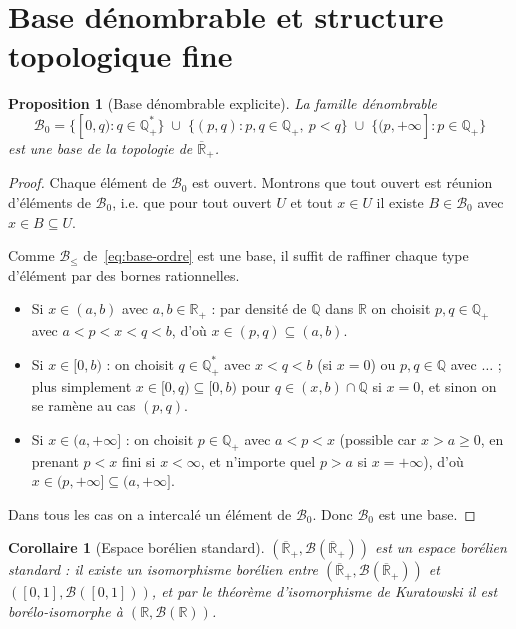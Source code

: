 \documentclass[11pt,a4paper]{article}
\theoremstyle{plain}
\newtheorem{proposition}[theorem]{Proposition}
\newtheorem{corollary}[theorem]{Corollaire}
\theoremstyle{definition}
\newcommand{\R}{\mathbb{R}}
\newcommand{\Q}{\mathbb{Q}}
\newcommand{\Rp}{\mathbb{R}_+}
\newcommand{\Rpb}{\overline{\mathbb{R}}_+}
\newcommand{\B}{\mathcal{B}}
\begin{document}
\section{Base dénombrable et structure topologique fine}

\begin{proposition}[Base dénombrable explicite]\label{prop:base-denombrable}
La famille dénombrable
\[
\mathcal{B}_0=\big\{[0,q): q\in\Q_+^*\big\}\;\cup\;
\big\{(p,q): p,q\in\Q_+,\ p<q\big\}\;\cup\;
\big\{(p,+\infty]: p\in\Q_+\big\}
\]
est une base de la topologie de $\Rpb$.
\end{proposition}

\begin{proof}
Chaque élément de $\mathcal{B}_0$ est ouvert. Montrons que tout ouvert est
réunion d'éléments de $\mathcal{B}_0$, i.e. que pour tout ouvert $U$ et tout
$x\in U$ il existe $B\in\mathcal{B}_0$ avec $x\in B\subseteq U$.

Comme $\mathcal{B}_\le$ de~\eqref{eq:base-ordre} est une base, il suffit de
raffiner chaque type d'élément par des bornes rationnelles.
\begin{itemize}[nosep]
\item Si $x\in(a,b)$ avec $a,b\in\Rp$ : par densité de $\Q$ dans $\R$ on choisit
$p,q\in\Q_+$ avec $a<p<x<q<b$, d'où $x\in(p,q)\subseteq(a,b)$.
\item Si $x\in[0,b)$ : on choisit $q\in\Q_+^*$ avec $x<q<b$ (si $x=0$) ou
$p,q\in\Q$ avec $\ldots$ ; plus simplement $x\in[0,q)\subseteq[0,b)$ pour
$q\in(x,b)\cap\Q$ si $x=0$, et sinon on se ramène au cas $(p,q)$.
\item Si $x\in(a,+\infty]$ : on choisit $p\in\Q_+$ avec $a<p<x$ (possible car
$x>a\ge0$, en prenant $p<x$ fini si $x<\infty$, et n'importe quel $p>a$ si
$x=+\infty$), d'où $x\in(p,+\infty]\subseteq(a,+\infty]$.
\end{itemize}
Dans tous les cas on a intercalé un élément de $\mathcal{B}_0$. Donc
$\mathcal{B}_0$ est une base.
\end{proof}

\begin{corollary}[Espace borélien standard]\label{cor:standard}
$(\Rpb,\B(\Rpb))$ est un \emph{espace borélien standard} : il existe un
isomorphisme borélien entre $(\Rpb,\B(\Rpb))$ et $([0,1],\B([0,1]))$, et par le
théorème d'isomorphisme de Kuratowski il est borélo-isomorphe à
$(\R,\B(\R))$.
\end{corollary}
\end{document}
